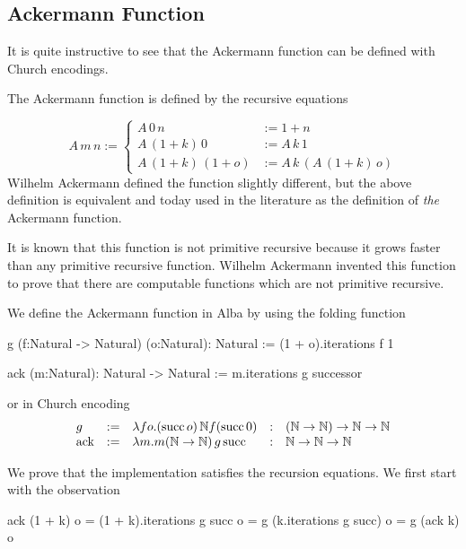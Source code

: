 \subsection{Ackermann Function}

It is quite instructive to see that the Ackermann function can be defined with
Church encodings.

The Ackermann function is defined by the recursive equations

$$
A \, m \, n :=
\begin{cases}
  A\, 0\, n &:= 1 + n
  \\
  A\, (1+k)\, 0 &:= A\, k\, 1
  \\
  A\, (1+k)\, (1+o) & := A\, k\, (A\, (1+k)\, o)
\end{cases}
$$
%
Wilhelm Ackermann defined the function slightly different, but the above
definition is equivalent and today used in the literature as the definition of
\emph{the} Ackermann function.

It is known that this function is not primitive recursive because it grows
faster than any primitive recursive function. Wilhelm Ackermann invented this
function to prove that there are computable functions which are not primitive
recursive.

We define the Ackermann function in Alba by using the folding function

\begin{alba}
  g (f:Natural -> Natural) (o:Natural): Natural :=
    (1 + o).iterations f 1

  ack (m:Natural): Natural -> Natural :=
    m.iterations g successor
\end{alba}

or in Church encoding
$$
\begin{array}{lllll}
  g &:=
  & \lambda f o . (\text{succ}\, o)\, \Natural f (\text{succ}\, 0)
  &:& (\Natural \to \Natural) \to \Natural \to \Natural

  \\

  \text{ack} &:=
  & \lambda m. m (\Natural\to\Natural)\, g\, \text{succ}
  &:& \Natural \to \Natural \to \Natural

\end{array}
$$

We prove that the implementation satisfies the recursion equations. We first
start with the observation

\begin{alba}
  ack (1 + k) o  = (1 + k).iterations g succ o
                 = g (k.iterations g succ) o
                 = g (ack k) o
\end{alba}


